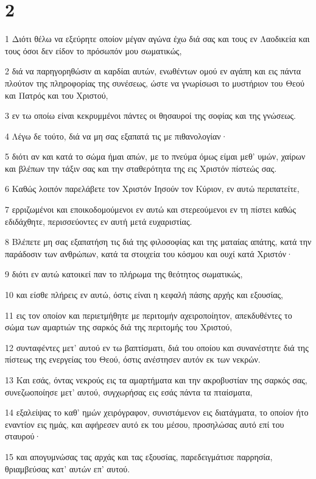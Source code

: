 \chapter{2}

\par 1 Διότι θέλω να εξεύρητε οποίον μέγαν αγώνα έχω διά σας και τους εν Λαοδικεία και τους όσοι δεν είδον το πρόσωπόν μου σωματικώς,
\par 2 διά να παρηγορηθώσιν αι καρδίαι αυτών, ενωθέντων ομού εν αγάπη και εις πάντα πλούτον της πληροφορίας της συνέσεως, ώστε να γνωρίσωσι το μυστήριον του Θεού και Πατρός και του Χριστού,
\par 3 εν τω οποίω είναι κεκρυμμένοι πάντες οι θησαυροί της σοφίας και της γνώσεως.
\par 4 Λέγω δε τούτο, διά να μη σας εξαπατά τις με πιθανολογίαν·
\par 5 διότι αν και κατά το σώμα ήμαι απών, με το πνεύμα όμως είμαι μεθ' υμών, χαίρων και βλέπων την τάξιν σας και την σταθερότητα της εις Χριστόν πίστεώς σας.
\par 6 Καθώς λοιπόν παρελάβετε τον Χριστόν Ιησούν τον Κύριον, εν αυτώ περιπατείτε,
\par 7 ερριζωμένοι και εποικοδομούμενοι εν αυτώ και στερεούμενοι εν τη πίστει καθώς εδιδάχθητε, περισσεύοντες εν αυτή μετά ευχαριστίας.
\par 8 Βλέπετε μη σας εξαπατήση τις διά της φιλοσοφίας και της ματαίας απάτης, κατά την παράδοσιν των ανθρώπων, κατά τα στοιχεία του κόσμου και ουχί κατά Χριστόν·
\par 9 διότι εν αυτώ κατοικεί παν το πλήρωμα της θεότητος σωματικώς,
\par 10 και είσθε πλήρεις εν αυτώ, όστις είναι η κεφαλή πάσης αρχής και εξουσίας,
\par 11 εις τον οποίον και περιετμήθητε με περιτομήν αχειροποίητον, απεκδυθέντες το σώμα των αμαρτιών της σαρκός διά της περιτομής του Χριστού,
\par 12 συνταφέντες μετ' αυτού εν τω βαπτίσματι, διά του οποίου και συνανέστητε διά της πίστεως της ενεργείας του Θεού, όστις ανέστησεν αυτόν εκ των νεκρών.
\par 13 Και εσάς, όντας νεκρούς εις τα αμαρτήματα και την ακροβυστίαν της σαρκός σας, συνεζωοποίησε μετ' αυτού, συγχωρήσας εις εσάς πάντα τα πταίσματα,
\par 14 εξαλείψας το καθ' ημών χειρόγραφον, συνιστάμενον εις διατάγματα, το οποίον ήτο εναντίον εις ημάς, και αφήρεσεν αυτό εκ του μέσου, προσηλώσας αυτό επί του σταυρού·
\par 15 και απογυμνώσας τας αρχάς και τας εξουσίας, παρεδειγμάτισε παρρησία, θριαμβεύσας κατ' αυτών επ' αυτού.
